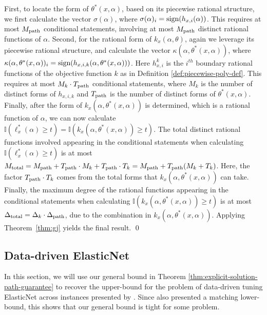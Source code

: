    First, to locate the form of $\theta^*(x, \alpha)$, based on its piecewise rational structure, we first calculate the vector $\sigma(\alpha)$, where $\sigma(\alpha)_i = {\text{sign}}(h_{x, i}(\alpha))$. This requires at most $M_\textup{path}$ conditional statements, involving at most $M_\textup{path}$ distinct rational functions of $\alpha$. Second, for the rational form of $k_x(\alpha, \theta)$, again we leverage its piecewise rational structure, and calculate the vector $\kappa(\alpha, \theta^*(x, \alpha))$, where $\kappa(\alpha, \theta^*(x, \alpha))_i = {\text{sign}}(h_{x, i, k}(\alpha, \theta^*(x, \alpha)))$. Here $h^k_{x, i}$ is the $i^{th}$ boundary rational functions of the objective function $k$ as in Definition \ref{def:piecewise-poly-def}. This requires at most $M_k \cdot T_\textup{path}$ conditional statements, where $M_k$ is the number of distinct forms of $h_{x, i, k}$ and $T_\textup{path}$ is the number of distinct forms of $\theta^*(x, \alpha)$. Finally, after the form of $k_x(\alpha, \theta^*(x, \alpha))$ is determined, which is a rational function of $\alpha$, we can now calculate $\mathbb{I}(\ell^*_x(\alpha) \geq t) = \mathbb{I}(k_x(\alpha, \theta^*(x, \alpha)) \geq t)$. The total distinct rational functions involved appearing in the conditional statements when calculating $\mathbb{I}(\ell^*_x(\alpha) \geq t)$ is at most $M_\textup{total} = M_\textup{path} + T_\textup{path}\cdot M_k + T_\textup{path} \cdot T_k = M_\textup{path} + T_\textup{path}(M_k + T_k)$. Here, the factor $T_\textup{path} \cdot T_k$ comes from the total forms that $k_x(\alpha, \theta^*(x, \alpha))$ can take. Finally, the maximum degree of the rational functions appearing in the conditional statements when calculating $\mathbb{I}(k_x(\alpha, \theta^*(x, \alpha)) \geq t)$ is at most $\Delta_\textup{total} = \Delta_k \cdot \Delta_\textup{path}$, due to the combination in $k_x(\alpha, \theta^*(x, \alpha))$. Applying Theorem~\ref{thm:gj} yields the final result.
\qed

\subsection{Data-driven ElasticNet} \label{apx:recovering-elastic-net}
In this section, we will use our general bound in Theorem \ref{thm:explicit-solution-path-guarantee} to recover the upper-bound for the problem of data-driven tuning ElasticNet across instances presented by \citet{balcan2023new}. Since \citet{balcan2023new} also presented a matching lower-bound, this shows that our general bound is tight for some problem. 

